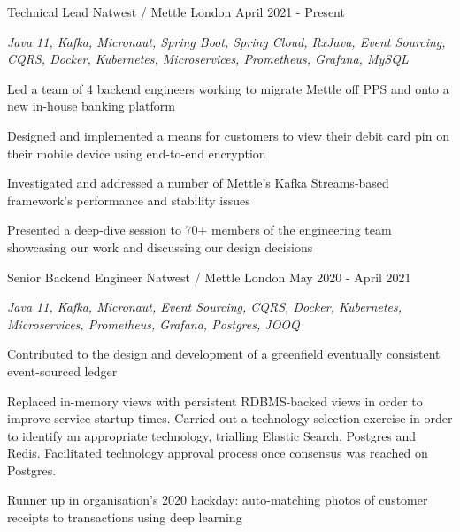 

\begin{cventries}


  \cventry
    {Technical Lead} %
    {Natwest / Mettle} %
    {London} %
    {April 2021 - Present} %
    {
      \begin{cvitems} %
        \item {\itshape{Java 11, Kafka, Micronaut, Spring Boot, Spring Cloud, RxJava, Event Sourcing, CQRS, Docker, Kubernetes, Microservices, Prometheus, Grafana, MySQL}}
        \item {Led a team of 4 backend engineers working to migrate Mettle off PPS and onto a new in-house banking platform}        
        \item {Designed and implemented a means for customers to view their debit card pin on their mobile device using end-to-end encryption}        
        \item {Investigated and addressed a number of Mettle's Kafka Streams-based framework's performance and stability issues}
        \item {Presented a deep-dive session to 70+ members of the engineering team showcasing our work and discussing our design decisions}
      \end{cvitems}
    }

  \cventry
    {Senior Backend Engineer} %
    {Natwest / Mettle} %
    {London} %
    {May 2020 - April 2021} %
    {
      \begin{cvitems} %
        \item {\itshape{Java 11, Kafka, Micronaut, Event Sourcing, CQRS, Docker, Kubernetes, Microservices, Prometheus, Grafana, Postgres, JOOQ}}
        \item {Contributed to the design and development of a greenfield eventually consistent event-sourced ledger}
        \item {Replaced in-memory views with persistent RDBMS-backed views in order to improve service startup times. Carried out a technology selection exercise in order to identify an appropriate technology, trialling Elastic Search, Postgres and Redis. Facilitated technology approval process once consensus was reached on Postgres.}
        \item {Runner up in organisation's 2020 hackday: auto-matching photos of customer receipts to transactions using deep learning}
      \end{cvitems}
    }


\end{cventries}
